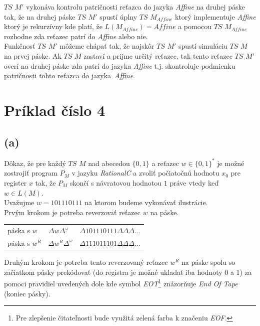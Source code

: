 \documentclass[11pt,a4paper]{article}
\newcommand{\green}[1]{\textcolor{OliveGreen}{#1}}
\begin{document}
$TS$ $M'$ vykonáva kontrolu patričnosti reťazca do jazyka \textit{Affine} na druhej páske tak, že na druhej páske $TS$ $M'$ spustí úplny $TS$ $M_{Affine}$ ktorý implementuje \textit{Affine} ktorý je rekurzívny kde platí, že $L(M_{Affine}) = Affine$ a pomocou $TS$ $M_{Affine}$ rozhodne zda reťazec patrí do \textit{Affine} alebo nie.\\

Funkčnosť $TS$ $M'$ môžeme chápať tak, že najskôr $TS$ $M'$ spustí simuláciu $TS$ $M$ na prvej páske. Ak $TS$ $M$ zastaví a prijme určitý reťazec, tak tento reťazec $TS$ $M'$ overí na druhej páske zda patrí do jazyka \textit{Affine} t.j. skontroluje podmienku patričnosti tohto reťazca do jazyka \textit{Affine}.

\newpage
\section{Príklad číslo 4} %

\subsection{(a)}
Dôkaz, že pre každý $TS$ $M$ nad abecedou $\{0,1\}$ a reťazec $w \in \{0,1\}^*$ je možné zostrojiť program $P_M$ v jazyku \textit{RationalC} a zvoliť počiatočnú hodnotu $x_0$ pre register $x$ tak, že $P_M$ skončí s návratovou hodnotou $1$ práve vtedy keď $w \in L(M)$.\\

Uvažujme $w = 1 0 1 1 1 0 1 1 1$ na ktorom budeme vykonávať ilustrácie.\\

Prvým krokom je potreba reverzovať reťazec $w$ na páske.

\begin{center}
    \begin{tabular}{l|l|l}
        páska s $w$   & $\Delta w   \Delta^\omega$ & $\Delta 1 0 1 1 1 0 1 1 1 \Delta \Delta \Delta \dots$\\
        páska s $w^R$ & $\Delta w^R \Delta^\omega$ & $\Delta 1 1 1 0 1 1 1 0 1 \Delta \Delta \Delta \dots$\\
    \end{tabular}
\end{center}

Druhým krokom je potreba tento reverzovaný reťazec $w^R$ na páske spolu so začiatkom pásky prekódovať (do registra je možné ukladať iba hodnoty $0$ a $1$) za pomoci pravidiel uvedených dole kde symbol \green{\textit{EOT}}\footnote{Pre zlepšenie čitateľnosti bude využitá zelená farba k značeniu \textit{EOF}.} znázorňuje \textit{End Of Tape} (koniec pásky).
\end{document}
